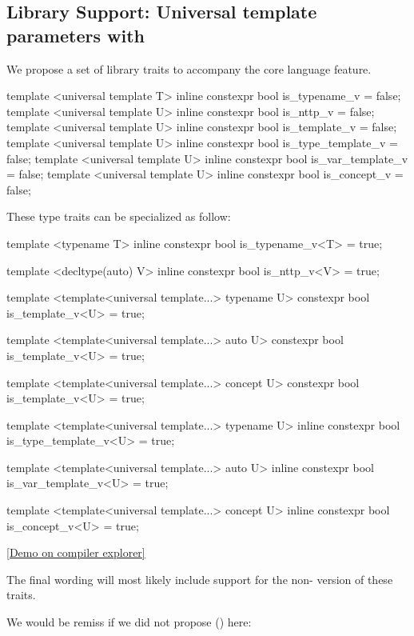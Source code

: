 \documentclass{wg21}
\begin{document}
\subsection{Library Support: Universal template parameters with }

We propose a set of library traits to accompany the core language feature.


\begin{colorblock}
template <universal template T>
inline constexpr bool is_typename_v = false;
template <universal template U>
inline constexpr bool is_nttp_v = false;
template <universal template U>
inline constexpr bool is_template_v = false;
template <universal template U>
inline constexpr bool is_type_template_v = false;
template <universal template U>
inline constexpr bool is_var_template_v = false;
template <universal template U>
inline constexpr bool is_concept_v = false;
\end{colorblock}

These type traits can be specialized as follow:

\begin{colorblock}
template <typename T>
inline constexpr bool is_typename_v<T> = true;

template <decltype(auto) V>
inline constexpr bool is_nttp_v<V> = true;

template <template<universal template...> typename U>
constexpr bool is_template_v<U> = true;

template <template<universal template...> auto U>
constexpr bool is_template_v<U> = true;

template <template<universal template...> concept U>
constexpr bool is_template_v<U> = true;

template <template<universal template...> typename U>
inline constexpr bool is_type_template_v<U> = true;

template <template<universal template...> auto U>
inline constexpr bool is_var_template_v<U> = true;

template <template<universal template...> concept U>
inline constexpr bool is_concept_v<U> = true;
\end{colorblock}

\href{https://godbolt.org/z/cEfvsaf4j}{[Demo on compiler explorer]}

The final wording will most likely include support for the non- version of these traits.

We would be remiss if we did not propose  () here:
\end{document}
